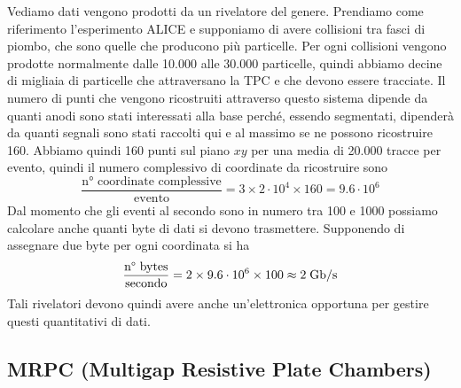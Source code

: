 \begin{esempio}
   Vediamo dati vengono prodotti da un rivelatore del genere. Prendiamo come riferimento l'esperimento ALICE e supponiamo di avere collisioni tra fasci di piombo, che sono quelle che producono più particelle. Per ogni collisioni vengono prodotte normalmente dalle 10.000 alle 30.000 particelle, quindi abbiamo decine di migliaia di particelle che attraversano la TPC e che devono essere tracciate. Il numero di punti che vengono ricostruiti attraverso questo sistema dipende da quanti anodi sono stati interessati alla base perché, essendo segmentati, dipenderà da quanti segnali sono stati raccolti qui e al massimo se ne possono ricostruire 160. Abbiamo quindi 160 punti sul piano $xy$ per una media di 20.000 tracce per evento, quindi il numero complessivo di coordinate da ricostruire sono
   \begin{equation*}
      \frac{\text{n° coordinate complessive}}{\text{evento}}
      =3 \times 2 \cdot 10^4 \times 160
      =9.6 \cdot 10^6
   \end{equation*}
   Dal momento che gli eventi al secondo sono in numero tra 100 e 1000 possiamo calcolare anche quanti byte di dati si devono trasmettere. Supponendo di assegnare due byte per ogni coordinata si ha
   \begin{equation*}
      \frac{\text{n° bytes}}{\text{secondo}}
      =2 \times 9.6 \cdot 10^6 \times 100
      \approx 2 \; \rm Gb/s
   \end{equation*}
   Tali rivelatori devono quindi avere anche un'elettronica opportuna per gestire questi quantitativi di dati.
\end{esempio}

\subsection{MRPC (Multigap Resistive Plate Chambers)}

